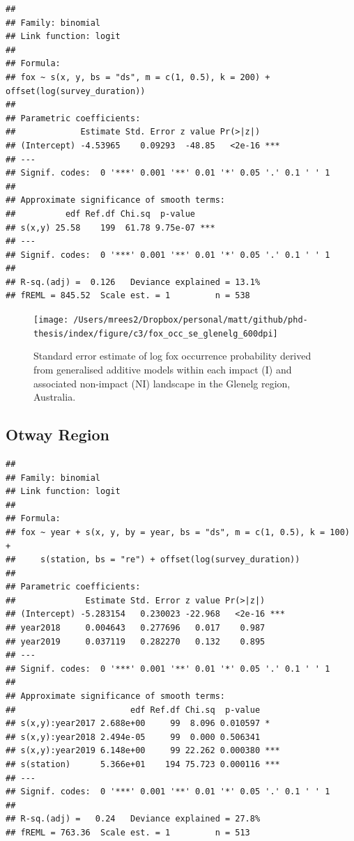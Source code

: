 \documentclass[]{elsarticle} %
\begin{document}
\begin{verbatim}
## 
## Family: binomial 
## Link function: logit 
## 
## Formula:
## fox ~ s(x, y, bs = "ds", m = c(1, 0.5), k = 200) + offset(log(survey_duration))
## 
## Parametric coefficients:
##             Estimate Std. Error z value Pr(>|z|)    
## (Intercept) -4.53965    0.09293  -48.85   <2e-16 ***
## ---
## Signif. codes:  0 '***' 0.001 '**' 0.01 '*' 0.05 '.' 0.1 ' ' 1
## 
## Approximate significance of smooth terms:
##          edf Ref.df Chi.sq  p-value    
## s(x,y) 25.58    199  61.78 9.75e-07 ***
## ---
## Signif. codes:  0 '***' 0.001 '**' 0.01 '*' 0.05 '.' 0.1 ' ' 1
## 
## R-sq.(adj) =  0.126   Deviance explained = 13.1%
## fREML = 845.52  Scale est. = 1         n = 538
\end{verbatim}

\newpage

\begin{figure}

{\centering \texttt{[image: /Users/mrees2/Dropbox/personal/matt/github/phd-thesis/index/figure/c3/fox\_occ\_se\_glenelg\_600dpi]} 

}

\caption{Standard error estimate of log fox occurrence probability derived from generalised additive models within each impact (I) and associated non-impact (NI) landscape in the Glenelg region, Australia.}\label{fig:density-fox-se-g}
\end{figure}

\newpage

\hypertarget{otway-region-1}{%
\subsection{Otway Region}\label{otway-region-1}}

\begin{verbatim}
## 
## Family: binomial 
## Link function: logit 
## 
## Formula:
## fox ~ year + s(x, y, by = year, bs = "ds", m = c(1, 0.5), k = 100) + 
##     s(station, bs = "re") + offset(log(survey_duration))
## 
## Parametric coefficients:
##              Estimate Std. Error z value Pr(>|z|)    
## (Intercept) -5.283154   0.230023 -22.968   <2e-16 ***
## year2018     0.004643   0.277696   0.017    0.987    
## year2019     0.037119   0.282270   0.132    0.895    
## ---
## Signif. codes:  0 '***' 0.001 '**' 0.01 '*' 0.05 '.' 0.1 ' ' 1
## 
## Approximate significance of smooth terms:
##                       edf Ref.df Chi.sq  p-value    
## s(x,y):year2017 2.688e+00     99  8.096 0.010597 *  
## s(x,y):year2018 2.494e-05     99  0.000 0.506341    
## s(x,y):year2019 6.148e+00     99 22.262 0.000380 ***
## s(station)      5.366e+01    194 75.723 0.000116 ***
## ---
## Signif. codes:  0 '***' 0.001 '**' 0.01 '*' 0.05 '.' 0.1 ' ' 1
## 
## R-sq.(adj) =   0.24   Deviance explained = 27.8%
## fREML = 763.36  Scale est. = 1         n = 513
\end{verbatim}
\end{document}

